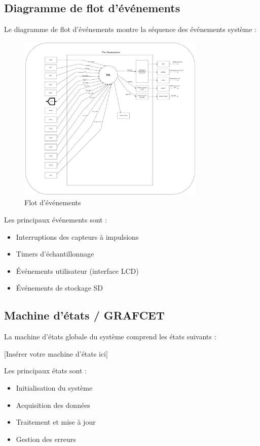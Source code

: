 \documentclass[12pt]{article}
\begin{document}
\subsection{Diagramme de flot d'événements}
Le diagramme de flot d'événements montre la séquence des événements système :

\begin{figure}[H]
    \capstart
    \centering
    \includegraphics[width=0.8\textwidth]{./images/flot_evenements.png}
    \caption{Flot d'événements}
    \label{fig:flot_d_evenements}
\end{figure}

Les principaux événements sont :
\begin{itemize}
    \item Interruptions des capteurs à impulsions
    \item Timers d'échantillonnage
    \item Événements utilisateur (interface LCD)
    \item Événements de stockage SD
\end{itemize}

\subsection{Machine d'états / GRAFCET}
La machine d'états globale du système comprend les états suivants :

[Insérer votre machine d'états ici]

Les principaux états sont :
\begin{itemize}
    \item Initialisation du système
    \item Acquisition des données
    \item Traitement et mise à jour
    \item Gestion des erreurs
\end{itemize}
\end{document}
